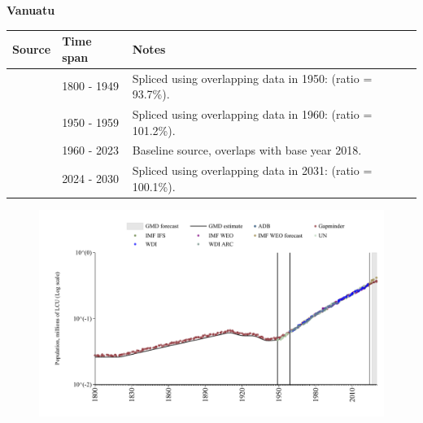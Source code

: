 \documentclass[12pt,a4paper,landscape]{article}
\begin{document}
\begin{adjustbox}{max totalsize={\paperwidth}{\paperheight},center}
\begin{minipage}[t][\textheight][t]{\textwidth}
\vspace*{0.5cm}
{}
\begin{center}
{\Large\bfseries Vanuatu}
\end{center}
\vspace{0.5cm}
\begin{table}[H]
\centering
\small
\begin{tabular}{|l|l|l|}
\hline
\textbf{Source} & \textbf{Time span} & \textbf{Notes} \\
\hline
\rowcolor{white}\cite{Gapminder}& 1800 - 1949 &Spliced using overlapping data in 1950: (ratio = 93.7\%).\\
\rowcolor{lightgray}\cite{IMF_IFS}& 1950 - 1959 &Spliced using overlapping data in 1960: (ratio = 101.2\%).\\
\rowcolor{white}\cite{WDI}& 1960 - 2023 &Baseline source, overlaps with base year 2018.\\
\rowcolor{lightgray}\cite{Gapminder}& 2024 - 2030 &Spliced using overlapping data in 2031: (ratio = 100.1\%).\\
\hline
\end{tabular}
\end{table}
\begin{figure}[H]
\centering
\includegraphics[width=\textwidth,height=0.6\textheight,keepaspectratio]{graphs/VUT_pop.pdf}
\end{figure}
\end{minipage}
\end{adjustbox}
\end{document}
